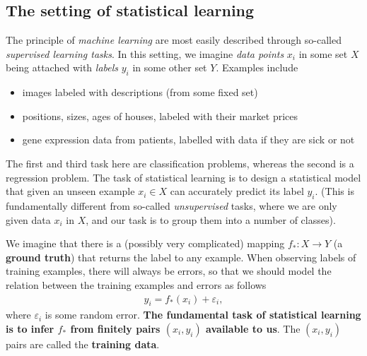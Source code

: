 \documentclass{article}
\begin{document}
\subsection{The setting of statistical learning}
The principle of \emph{machine learning} are most easily described through so-called \emph{supervised learning tasks}. In this setting, we imagine \emph{data points} $x_i$ in some set $X$
being attached with \emph{labels} $y_i$ in some other set $Y$. Examples include 
\begin{itemize}
    \item images labeled with descriptions (from some fixed set)
    \item positions, sizes, ages of houses, labeled with their market prices
    \item gene expression data from patients, labelled with data if they are sick or not 
\end{itemize}
The first and third task here are classification problems, whereas the second is a regression problem.
The task of statistical learning is to design a statistical model that given an unseen example $x_i \in X$ can accurately predict its label $y_i$. (This is fundamentally different from so-called \emph{unsupervised} tasks, where we are only given data $x_i$ in $X$, and our task is to group them into a number of classes).

We imagine that there is a (possibly very complicated)  mapping $f_*:X \to Y$ (a \textbf{ground truth}) that returns the label to any example. When observing labels of training examples, there will always be errors, so that we should model the relation between the training examples and errors as follows
\begin{align}
    y_i = f_*(x_i) + \varepsilon_i, \label{eq:model}
\end{align}
where $\varepsilon_i$ is some random error. \textbf{The fundamental task of statistical learning is to infer $f_*$ from finitely pairs $(x_i,y_i)$ available to us}. The $(x_i,y_i)$ pairs are called the \textbf{training data}.
\end{document}
